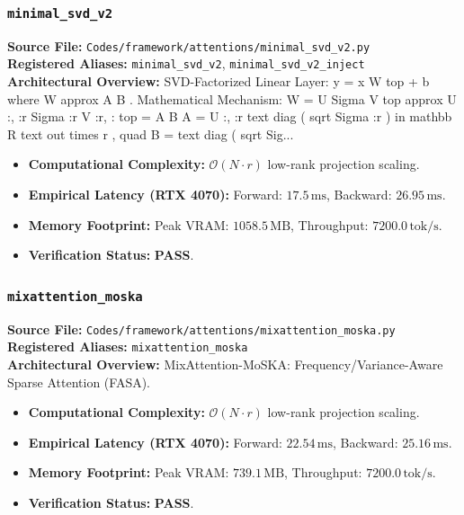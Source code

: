 \subsubsection{\texttt{minimal\_svd\_v2}}
\textbf{Source File:} \texttt{Codes/framework/attentions/minimal\_svd\_v2.py} \\
\textbf{Registered Aliases:} \texttt{minimal\_svd\_v2}, \texttt{minimal\_svd\_v2\_inject} \\
\textbf{Architectural Overview:} SVD-Factorized Linear Layer: y = x W top + b where W approx A B . Mathematical Mechanism: W = U Sigma V top approx U :, :r Sigma :r V :r, : top = A B A = U :, :r text diag ( sqrt Sigma :r ) in mathbb R text out times r , quad B = text diag ( sqrt Sig...

\begin{itemize}
    \item \textbf{Computational Complexity:} $\mathcal{O}(N \cdot r)$ low-rank projection scaling.
    \item \textbf{Empirical Latency (RTX 4070):} Forward: $17.5\,\text{ms}$, Backward: $26.95\,\text{ms}$.
    \item \textbf{Memory Footprint:} Peak VRAM: $1058.5\,\text{MB}$, Throughput: $7200.0\,\text{tok/s}$.
    \item \textbf{Verification Status:} \textbf{PASS}.
\end{itemize}

\subsubsection{\texttt{mixattention\_moska}}
\textbf{Source File:} \texttt{Codes/framework/attentions/mixattention\_moska.py} \\
\textbf{Registered Aliases:} \texttt{mixattention\_moska} \\
\textbf{Architectural Overview:} MixAttention-MoSKA: Frequency/Variance-Aware Sparse Attention (FASA).

\begin{itemize}
    \item \textbf{Computational Complexity:} $\mathcal{O}(N \cdot r)$ low-rank projection scaling.
    \item \textbf{Empirical Latency (RTX 4070):} Forward: $22.54\,\text{ms}$, Backward: $25.16\,\text{ms}$.
    \item \textbf{Memory Footprint:} Peak VRAM: $739.1\,\text{MB}$, Throughput: $7200.0\,\text{tok/s}$.
    \item \textbf{Verification Status:} \textbf{PASS}.
\end{itemize}

